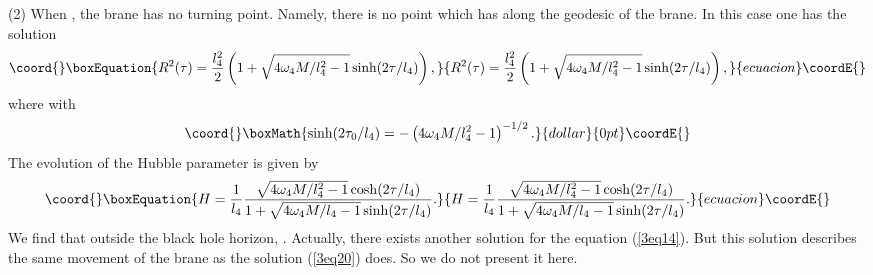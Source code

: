 \documentclass[a4paper,12pt]{article}
\begin{document}
(2) When \coordHE{}, the brane has no turning point. 
Namely, there is no point which has \coordHE{} along the geodesic of 
the brane. In this case one has the solution
    \begin{equation}\coord{}\boxEquation{
   \label{3eq20}
    R^2(\tau)= \frac{l_4^2}{2}\left (1 +\sqrt{4\omega_4M/l_4^2
    -1}\sinh( 2\tau /l_4)\right),
    }{
   R^2(\tau)= \frac{l_4^2}{2}\left (1 +\sqrt{4\omega_4M/l_4^2
    -1}\sinh( 2\tau /l_4)\right),
    }{ecuacion}\coordE{}\end{equation}
    where \myHighlight{$\tau_0 \le \tau < \infty$}\coordHE{} with
    $$\coord{}\boxMath{ \sinh(2\tau_0/l_4) =-\left(4\omega_4 M/l_4^2-1
      \right)^{-1/2}.}{dollar}{0pt}\coordE{}$$
   The evolution of the Hubble parameter is given by
   \begin{equation}\coord{}\boxEquation{
   H
   =\frac{1}{l_4}\frac{\sqrt{4\omega_4M/l_4^2-1}\cosh(2\tau/l_4)}
    {1+\sqrt{4\omega_4M/l_4-1}\sinh(2\tau/l_4)}.
    }{
   H
   =\frac{1}{l_4}\frac{\sqrt{4\omega_4M/l_4^2-1}\cosh(2\tau/l_4)}
    {1+\sqrt{4\omega_4M/l_4-1}\sinh(2\tau/l_4)}.
    }{ecuacion}\coordE{}\end{equation}
 We find that outside the black hole horizon, \coordHE{}. Actually, there 
exists another solution for the equation (\ref{3eq14}). But this solution 
describes the same movement of the brane as the solution (\ref{3eq20}) 
does. So we do not present it here. 
\end{document}
